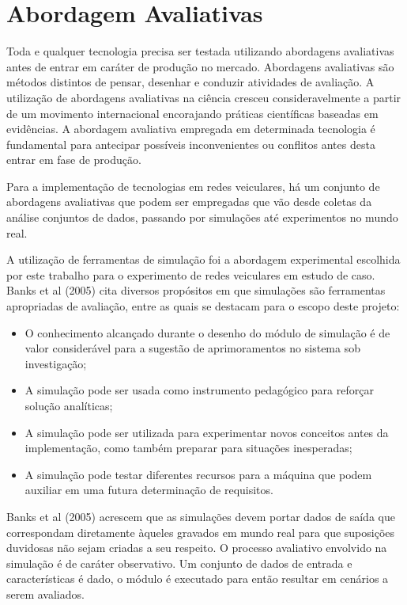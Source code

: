 \documentclass[
12pt,				%
openright,			%
oneside,			%
a4paper,			%
brazil,				%
]{abntex2}
\begin{document}
	\chapter{Abordagem Avaliativas}
	\label{chap:Abor_Aval}
	
	\par Toda e qualquer tecnologia precisa ser testada utilizando abordagens avaliativas antes de entrar em caráter de produção no mercado. Abordagens avaliativas são métodos distintos de pensar, desenhar e conduzir atividades de avaliação. A utilização de abordagens avaliativas na ciência cresceu consideravelmente a partir de um movimento internacional encorajando práticas científicas baseadas em evidências. A abordagem avaliativa empregada em determinada tecnologia é fundamental para antecipar possíveis inconvenientes ou conflitos antes desta entrar em fase de produção.
	
	\par Para a implementação de tecnologias em redes veiculares, há um conjunto de abordagens avaliativas que podem ser empregadas que vão desde coletas da análise conjuntos de dados, passando por simulações até experimentos no mundo real. 
	
	\par A utilização de ferramentas de simulação foi a abordagem experimental escolhida por este trabalho para o experimento de redes veiculares em estudo de caso. Banks et al (2005) cita diversos propósitos em que simulações são ferramentas apropriadas de avaliação, entre as quais se destacam para o escopo deste projeto:
	
	\begin{itemize}
		\item O conhecimento alcançado durante o desenho do módulo de simulação é de valor considerável para a sugestão de aprimoramentos no sistema sob investigação;
		\item A simulação pode ser usada como instrumento pedagógico para reforçar solução analíticas;
		\item A simulação pode ser utilizada para experimentar novos conceitos antes da implementação, como também preparar para situações inesperadas;
		\item A simulação pode testar diferentes recursos para a máquina que podem auxiliar em uma futura determinação de requisitos.
	\end{itemize}
	
	\par Banks et al (2005) acrescem que as simulações devem portar dados de saída que correspondam diretamente àqueles gravados em mundo real para que suposições duvidosas não sejam criadas a seu respeito. O processo avaliativo envolvido na simulação é de caráter observativo. Um conjunto de dados de entrada e características é dado, o módulo é executado para então resultar em cenários a serem avaliados.
	
\end{document}
